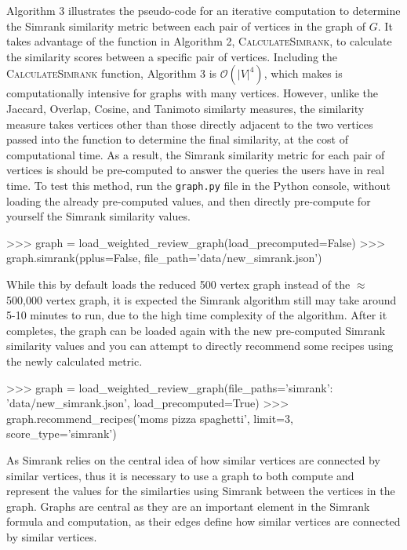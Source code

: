 \documentclass[fontsize=11pt]{article}
\begin{document}
Algorithm 3 illustrates the pseudo-code for an iterative computation to determine the Simrank similarity metric between each pair of vertices in the graph of $G$. It takes advantage of the function in Algorithm 2, \textsc{CalculateSimrank}, to calculate the similarity scores between a specific pair of vertices. Including the \textsc{CalculateSimrank} function, Algorithm 3 is $\mathcal{O}(\lvert V \rvert^4)$, which makes is computationally intensive for graphs with many vertices. However, unlike the Jaccard, Overlap, Cosine, and Tanimoto similarty measures, the similarity measure takes vertices other than those directly adjacent to the two vertices passed into the function to determine the final similarity, at the cost of computational time. As a result, the Simrank similarity metric for each pair of vertices is should be pre-computed to answer the queries the users have in real time. To test this method, run the \texttt{graph.py} file in the Python console, without loading the already pre-computed values, and then directly pre-compute for yourself the Simrank similarity values.

\begin{python}
>>> graph = load_weighted_review_graph(load_precomputed=False)
>>> graph.simrank(pplus=False, file_path='data/new_simrank.json')
\end{python}

While this by default loads the reduced 500 vertex graph instead of the $\approx$ 500,000 vertex graph, it is expected the Simrank algorithm still may take around 5-10 minutes to run, due to the high time complexity of the algorithm. After it completes, the graph can be loaded again with the new pre-computed Simrank similarity values and you can attempt to directly recommend some recipes using the newly calculated metric.

\begin{python}
>>> graph = load_weighted_review_graph(file_paths={'simrank': 'data/new_simrank.json'}, load_precomputed=True)
>>> graph.recommend_recipes('moms pizza spaghetti', limit=3, score_type='simrank')
\end{python}

As Simrank relies on the central idea of how similar vertices are connected by similar vertices, thus it is necessary to use a graph to both compute and represent the values for the similarties using Simrank between the vertices in the graph. Graphs are central as they are an important element in the Simrank formula and computation, as their edges define how similar vertices are connected by similar vertices. 
\end{document}
